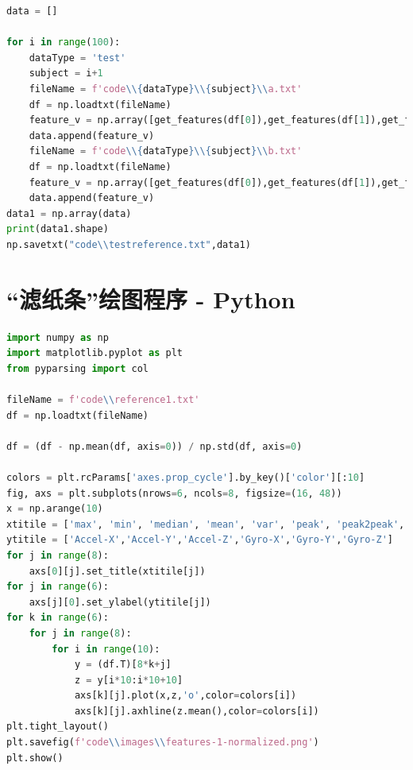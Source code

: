 \documentclass[withoutpreface]{cumcmthesis}
\begin{document}
\begin{appendices}
\begin{lstlisting}[language=python]
data = []

for i in range(100):
    dataType = 'test'
    subject = i+1
    fileName = f'code\\{dataType}\\{subject}\\a.txt'
    df = np.loadtxt(fileName)
    feature_v = np.array([get_features(df[0]),get_features(df[1]),get_features(df[2]),get_features(df[3]),get_features(df[4]),get_features(df[5])]).flatten()
    data.append(feature_v)
    fileName = f'code\\{dataType}\\{subject}\\b.txt'
    df = np.loadtxt(fileName)
    feature_v = np.array([get_features(df[0]),get_features(df[1]),get_features(df[2]),get_features(df[3]),get_features(df[4]),get_features(df[5])]).flatten()
    data.append(feature_v)
data1 = np.array(data)
print(data1.shape)
np.savetxt("code\\testreference.txt",data1)
\end{lstlisting}

\section{“滤纸条”绘图程序 - Python}

\begin{lstlisting}[language=python]
import numpy as np
import matplotlib.pyplot as plt
from pyparsing import col

fileName = f'code\\reference1.txt'
df = np.loadtxt(fileName)

df = (df - np.mean(df, axis=0)) / np.std(df, axis=0)

colors = plt.rcParams['axes.prop_cycle'].by_key()['color'][:10]
fig, axs = plt.subplots(nrows=6, ncols=8, figsize=(16, 48))
x = np.arange(10)
xtitile = ['max', 'min', 'median', 'mean', 'var', 'peak', 'peak2peak', 'rms']
ytitile = ['Accel-X','Accel-Y','Accel-Z','Gyro-X','Gyro-Y','Gyro-Z']
for j in range(8):
    axs[0][j].set_title(xtitile[j])
for j in range(6):
    axs[j][0].set_ylabel(ytitile[j])
for k in range(6):
    for j in range(8):
        for i in range(10):
            y = (df.T)[8*k+j]
            z = y[i*10:i*10+10]
            axs[k][j].plot(x,z,'o',color=colors[i])
            axs[k][j].axhline(z.mean(),color=colors[i])
plt.tight_layout()
plt.savefig(f'code\\images\\features-1-normalized.png')
plt.show()
\end{lstlisting}


\end{appendices}
\end{document}
